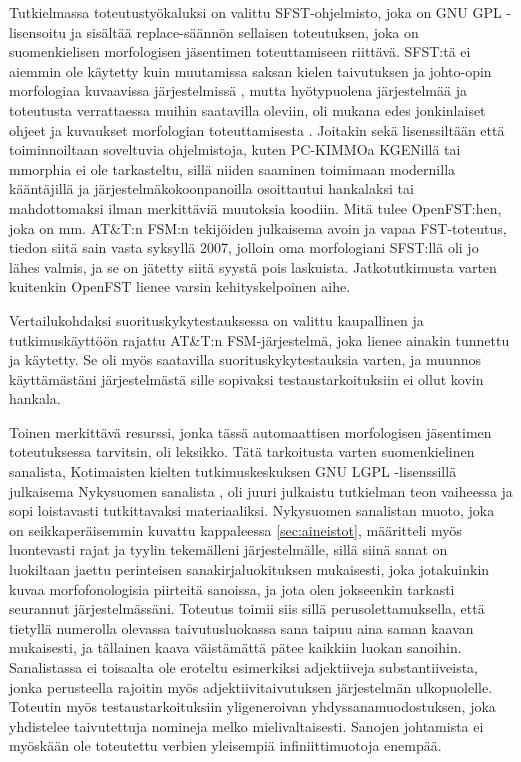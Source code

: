\documentclass[free]{flammie}
\begin{document}
Tutkielmassa toteutustyökaluksi on valittu SFST-ohjelmisto, joka on GNU GPL
-lisensoitu ja sisältää replace-säännön sellaisen toteutuksen, joka on
suomenkielisen morfologisen jäsentimen toteuttamiseen riittävä. SFST:tä ei
aiemmin ole käytetty kuin muutamissa saksan kielen taivutuksen ja johto-opin
morfologiaa kuvaavissa järjestelmissä \cite{schmid2006programming}, mutta
hyötypuolena järjestelmää ja toteutusta verrattaessa muihin saatavilla oleviin,
oli mukana edes jonkinlaiset ohjeet ja kuvaukset morfologian toteuttamisesta
\cite{schmid2007a,schmid2007b}. Joitakin sekä lisenssiltään että toiminnoiltaan
soveltuvia ohjelmistoja, kuten PC-KIMMOa KGENillä tai mmorphia ei ole
tarkasteltu, sillä niiden saaminen toimimaan modernilla kääntäjillä ja
järjestelmäkokoonpanoilla osoittautui hankalaksi tai mahdottomaksi ilman
merkittäviä muutoksia koodiin.  Mitä tulee OpenFST:hen, joka on mm.  AT\&T:n
FSM:n tekijöiden julkaisema avoin ja vapaa FST-toteutus, tiedon siitä sain vasta
syksyllä 2007, jolloin oma morfologiani SFST:llä oli jo lähes valmis, ja se on
jätetty siitä syystä pois laskuista. Jatkotutkimusta varten kuitenkin OpenFST
lienee varsin kehityskelpoinen aihe.

Vertailukohdaksi suorituskykytestauksessa on valittu kaupallinen ja
tutkimuskäyttöön rajattu AT\&T:n FSM-järjestelmä, joka lienee ainakin tunnettu
ja käytetty. Se oli myös saatavilla suorituskykytestauksia varten, ja muunnos
käyttämästäni järjestelmästä sille sopivaksi testaustarkoituksiin ei ollut kovin
hankala.

Toinen merkittävä resurssi, jonka tässä automaattisen morfologisen jäsentimen
toteutuksessa tarvitsin, oli leksikko. Tätä tarkoitusta varten suomenkielinen
sanalista, Kotimaisten kielten tutkimuskeskuksen GNU LGPL -lisenssillä
julkaisema Nykysuomen sanalista \cite{nykysuomensanalista200x}, oli
juuri julkaistu tutkielman teon vaiheessa ja sopi loistavasti tutkittavaksi
materiaaliksi.  Nykysuomen sanalistan muoto, joka on seikkaperäisemmin kuvattu
kappaleessa \ref{sec:aineistot}, määritteli myös luontevasti rajat ja tyylin tekemälleni
järjestelmälle, sillä siinä sanat on luokiltaan jaettu perinteisen
sanakirjaluokituksen mukaisesti, joka jotakuinkin kuvaa morfofonologisia
piirteitä sanoissa, ja jota olen jokseenkin tarkasti seurannut järjestelmässäni.
Toteutus toimii siis sillä perusolettamuksella, että tietyllä numerolla olevassa
taivutusluokassa sana taipuu aina saman kaavan mukaisesti, ja tällainen kaava
väistämättä pätee kaikkiin luokan sanoihin. Sanalistassa ei toisaalta ole
eroteltu esimerkiksi adjektiiveja substantiiveista, jonka perusteella rajoitin
myös adjektiivitaivutuksen järjestelmän ulkopuolelle. Toteutin myös
testaustarkoituksiin yligeneroivan yhdyssanamuodostuksen, joka yhdistelee
taivutettuja nomineja melko mielivaltaisesti. Sanojen johtamista ei myöskään ole
toteutettu verbien yleisempiä infiniittimuotoja enempää.
\end{document}
